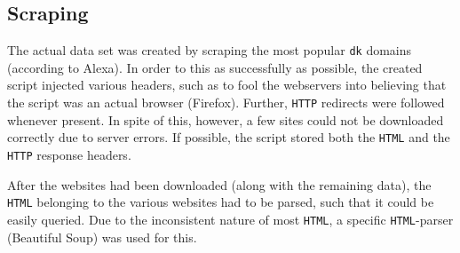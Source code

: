 \subsection{Scraping}
\label{subsec:scraping}


The actual data set was created by scraping the most popular \texttt{dk} domains (according to Alexa). In order to this as successfully as possible, the created script injected various headers, such as to fool the webservers into believing that the script was an actual browser (Firefox). Further, \texttt{HTTP} redirects were followed whenever present. In spite of this, however, a few sites could not be downloaded correctly due to server errors. If possible, the script stored both the \texttt{HTML} and the \texttt{HTTP} response headers.

After the websites had been downloaded (along with the remaining data), the \texttt{HTML} belonging to the various websites had to be parsed, such that it could be easily queried. Due to the inconsistent nature of most \texttt{HTML}, a specific \texttt{HTML}-parser (Beautiful Soup) was used for this.
